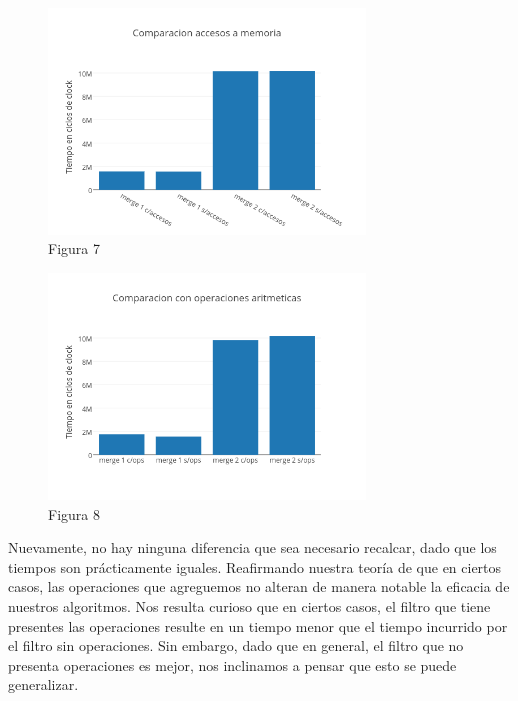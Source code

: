 \documentclass[a4paper]{article}
\begin{document}
\begin{figure}[h]
  \centering
    \includegraphics[width=0.75\textwidth]{imagenes/Comparacion accesos a memoria merge colores.png}
  \caption{Figura 7}
  \label{fig:graficomerge3}
\end{figure}
 \FloatBarrier
 

\begin{figure}[h]
  \centering
    \includegraphics[width=0.75\textwidth]{imagenes/Comparacion con operaciones aritmeticas merge colores.png}
  \caption{Figura 8}
  \label{fig:graficomerge4}
\end{figure}
 \FloatBarrier

Nuevamente, no hay ninguna diferencia que sea necesario recalcar, dado que los tiempos son prácticamente iguales. Reafirmando nuestra teoría de que en ciertos casos, las operaciones que agreguemos no alteran de manera notable la eficacia de nuestros algoritmos.
Nos resulta curioso que en ciertos casos, el filtro que tiene presentes las operaciones resulte en un tiempo menor que el tiempo incurrido por el filtro sin operaciones. Sin embargo, dado que en general, el filtro que no presenta operaciones es mejor, nos inclinamos a pensar que esto se puede generalizar.
\end{document}

